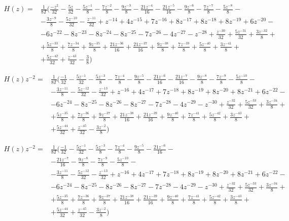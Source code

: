 \documentclass[12pt]{article}
\numberwithin{equation}{section}
\numberwithin{figure}{section}
\numberwithin{table}{section}
\begin{document}
\begin{equation}
\begin{split}
H(z) = & \frac{1}{8T}(\frac{-z^2}{32}-\frac{5z}{32}-\frac{5z^{-1}}{8}-\frac{7z^{-2}}{8}-\frac{9z^{-3}}{8}-\frac{21z^{-4}}{16}-\frac{21z^{-5}}{16}-\frac{9z^{-6}}{8}-\frac{7z^{-7}}{8}-\frac{5z^{-8}}{8}-\\
&-\frac{3z^{-9}}{8}-\frac{5z^{-10}}{32}-\frac{z^{-11}}{32}+z^{-14}+4z^{-15}+7z^{-16}+8z^{-17}+8z^{-18}+8z^{-19}+6z^{-20}-\\
&-6z^{-22}-8z^{-23}-8z^{-24}-8z^{-25}-7z^{-26}-4z^{-27}-z^{-28}+\frac{z^{-30}}{32}+\frac{5z^{-31}}{32}+\frac{3z^{-32}}{8}+\\
&+\frac{5z^{-33}}{8}+\frac{7z^{-34}}{8}+\frac{9z^{-35}}{8}+\frac{21z^{-36}}{16}+\frac{21z^{-37}}{16}+\frac{9z^{-38}}{8}+\frac{7z^{-39}}{8}+\frac{5z^{-40}}{8}+\frac{3z^{-41}}{8}+\\
&+\frac{5z^{-42}}{32}+\frac{z^{-43}}{32}-\frac{3}{8})
\end{split}
\end{equation}

\begin{equation}
\begin{split}
H(z) z^{-2}= & \frac{1}{8T}(\frac{-1}{32}-\frac{5z^{-1}}{32}-\frac{5z^{-3}}{8}-\frac{7z^{-4}}{8}-\frac{9z^{-5}}{8}-\frac{21z^{-6}}{16}-\frac{21z^{-7}}{16}-\frac{9z^{-8}}{8}-\frac{7z^{-9}}{8}-\frac{5z^{-10}}{8}-\\
&-\frac{3z^{-11}}{8}-\frac{5z^{-12}}{32}-\frac{z^{-13}}{32}+z^{-16}+4z^{-17}+7z^{-18}+8z^{-19}+8z^{-20}+8z^{-21}+6z^{-22}-\\
&-6z^{-24}-8z^{-25}-8z^{-26}-8z^{-27}-7z^{-28}-4z^{-29}-z^{-30}+\frac{z^{-32}}{32}+\frac{5z^{-33}}{32}+\frac{3z^{-34}}{8}+\\
&+\frac{5z^{-35}}{8}+\frac{7z^{-36}}{8}+\frac{9z^{-37}}{8}+\frac{21z^{-38}}{16}+\frac{21z^{-39}}{16}+\frac{9z^{-40}}{8}+\frac{7z^{-41}}{8}+\frac{5z^{-42}}{8}+\frac{3z^{-43}}{8}+\\
&+\frac{5z^{-44}}{32}+\frac{z^{-45}}{32}-\frac{3z^{-2}}{8})
\end{split}
\end{equation}

\begin{equation}
\begin{split}
H(z) z^{-2}= & \frac{1}{8T}(\frac{-1}{32}-\frac{5z^{-1}}{32}-\frac{5z^{-3}}{8}-\frac{7z^{-4}}{8}-\frac{9z^{-5}}{8}-\frac{21z^{-6}}{16}-\\
&-\frac{21z^{-7}}{16}-\frac{9z^{-8}}{8}-\frac{7z^{-9}}{8}-\frac{5z^{-10}}{8}-\\
&-\frac{3z^{-11}}{8}-\frac{5z^{-12}}{32}-\frac{z^{-13}}{32}+z^{-16}+4z^{-17}+7z^{-18}+8z^{-19}+8z^{-20}+8z^{-21}+6z^{-22}-\\
&-6z^{-24}-8z^{-25}-8z^{-26}-8z^{-27}-7z^{-28}-4z^{-29}-z^{-30}+\frac{z^{-32}}{32}+\frac{5z^{-33}}{32}+\frac{3z^{-34}}{8}+\\
&+\frac{5z^{-35}}{8}+\frac{7z^{-36}}{8}+\frac{9z^{-37}}{8}+\frac{21z^{-38}}{16}+\frac{21z^{-39}}{16}+\frac{9z^{-40}}{8}+\frac{7z^{-41}}{8}+\frac{5z^{-42}}{8}+\frac{3z^{-43}}{8}+\\
&+\frac{5z^{-44}}{32}+\frac{z^{-45}}{32}-\frac{3z^{-2}}{8})
\end{split}
\end{equation}
\end{document}
